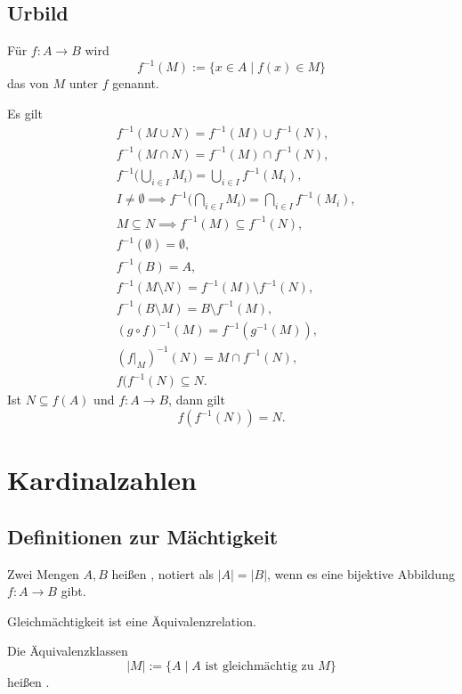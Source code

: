 \subsection{Urbild}
\begin{definition}[Urbild]\mbox{}\newline
Für $f\colon A\to B$ wird
\begin{equation}
f^{-1}(M) := \{x\in A\mid f(x)\in M\}
\end{equation}
das  von $M$ unter $f$ genannt.
\end{definition}
Es gilt
\begin{align}
& f^{-1}(M\cup N) = f^{-1}(M)\cup f^{-1}(N),\\
& f^{-1}(M\cap N) = f^{-1}(M)\cap f^{-1}(N),\\
& f^{-1}\Big(\bigcup_{i\in I}M_i\Big) = \bigcup_{i\in I} f^{-1}(M_i),\\
& I\ne\emptyset\implies f^{-1}\Big(\bigcap_{i\in I} M_i\Big) = \bigcap_{i\in I}f^{-1}(M_i),\\
& M\subseteq N\implies f^{-1}(M)\subseteq f^{-1}(N),\\
& f^{-1}(\emptyset) = \emptyset,\\
& f^{-1}(B) = A,\\
& f^{-1}(M\setminus N) = f^{-1}(M)\setminus f^{-1}(N),\\
& f^{-1}(B\setminus M) = B\setminus f^{-1}(M),\\
& (g\circ f)^{-1}(M) = f^{-1}(g^{-1}(M)),\\
& (f|_M)^{-1}(N) = M\cap f^{-1}(N),\\
& f(f^{-1}(N)\subseteq N.
\end{align}
Ist $N\subseteq f(A)$ und $f\colon A\to B$, dann gilt
\begin{equation}
f(f^{-1}(N)) = N.
\end{equation}


\newpage
\section{Kardinalzahlen}
\subsection{Definitionen zur Mächtigkeit}

\begin{definition}[Gleichmächtigkeit]\mbox{}\newline
Zwei Mengen $A,B$ heißen , notiert als
$|A|=|B|$, wenn es eine bijektive Abbildung $f\colon A\to B$ gibt.
\end{definition}
Gleichmächtigkeit ist eine Äquivalenzrelation.
\begin{definition}[Kardinalzahl]
Die Äquivalenzklassen
\begin{equation}
|M| := \{A\mid A\text{ ist gleichmächtig zu }M\}
\end{equation}
heißen .
\end{definition}

